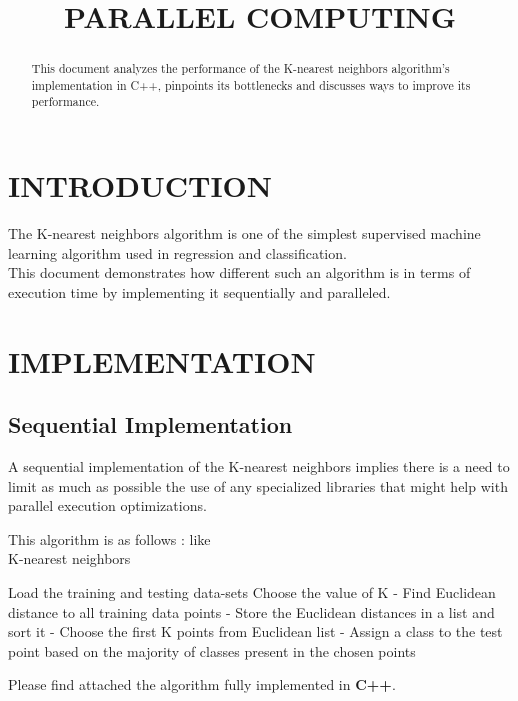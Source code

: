 \documentclass[conference]{IEEEtran}
\begin{document}
\title{PARALLEL COMPUTING \\
}

\author{
} 

\begin{abstract} 
This document analyzes the performance of the K-nearest neighbors algorithm's implementation in C++, pinpoints its bottlenecks and discusses ways to improve its performance. 
\end{abstract}
\section{ INTRODUCTION } 
The K-nearest neighbors algorithm is one of the simplest supervised machine learning algorithm used in regression and classification. \\
This document demonstrates how different such an algorithm is in terms of execution time by implementing it sequentially and paralleled.
\section{ IMPLEMENTATION }
\subsection{ Sequential Implementation}
A sequential implementation of the K-nearest neighbors implies there is a need to limit as much as possible the use of any specialized libraries that might help with parallel execution optimizations.~\cite{rd} \\
\begin{algorithm}
This algorithm is as follows : like \\
\caption{K-nearest neighbors}\label{euclid}
\begin{algorithmic}[1]
\STATE Load the training and testing data-sets 
\STATE Choose the value of K 
    \STATE  - Find Euclidean distance to all training data points
    \STATE  - Store the Euclidean distances in a list and sort it 
    \STATE  - Choose the first K points from Euclidean list
    \STATE  - Assign a class to the test point based on the majority of classes present in the chosen points
\ENDFORALL
\end{algorithmic}
\end{algorithm}
Please find attached the algorithm fully implemented in \textbf{C++}.
\end{document}
